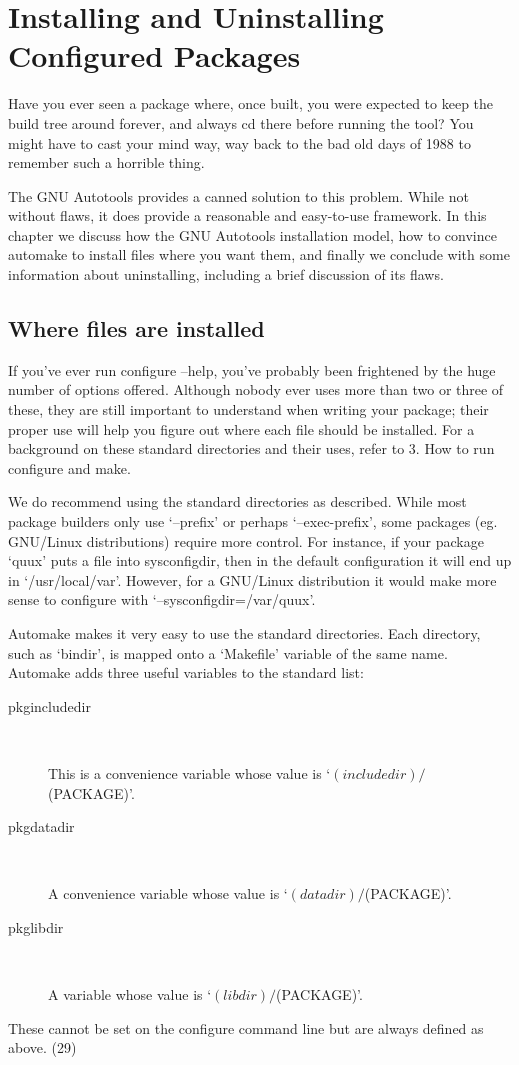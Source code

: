 \chapter{Installing and Uninstalling Configured Packages}

Have you ever seen a package where, once built, you were expected to keep the build tree around forever, and always cd there before running the tool? You might have to cast your mind way, way back to the bad old days of 1988 to remember such a horrible thing.

The GNU Autotools provides a canned solution to this problem. While not without flaws, it does provide a reasonable and easy-to-use framework. In this chapter we discuss how the GNU Autotools installation model, how to convince automake to install files where you want them, and finally we conclude with some information about uninstalling, including a brief discussion of its flaws. 

\section{Where files are installed}

If you've ever run configure --help, you've probably been frightened by the huge number of options offered. Although nobody ever uses more than two or three of these, they are still important to understand when writing your package; their proper use will help you figure out where each file should be installed. For a background on these standard directories and their uses, refer to 3. How to run configure and make.

We do recommend using the standard directories as described. While most package builders only use `--prefix' or perhaps `--exec-prefix', some packages (eg. GNU/Linux distributions) require more control. For instance, if your package `quux' puts a file into sysconfigdir, then in the default configuration it will end up in `/usr/local/var'. However, for a GNU/Linux distribution it would make more sense to configure with `--sysconfigdir=/var/quux'.

Automake makes it very easy to use the standard directories. Each directory, such as `bindir', is mapped onto a `Makefile' variable of the same name. Automake adds three useful variables to the standard list: 

\begin{description}
\item [pkgincludedir]
\

    This is a convenience variable whose value is `$(includedir)/$(PACKAGE)'.

\item[pkgdatadir]
\

    A convenience variable whose value is `$(datadir)/$(PACKAGE)'.

\item[pkglibdir]
\

    A variable whose value is `$(libdir)/$(PACKAGE)'.
\end{description}
These cannot be set on the configure command line but are always defined as above. (29)

